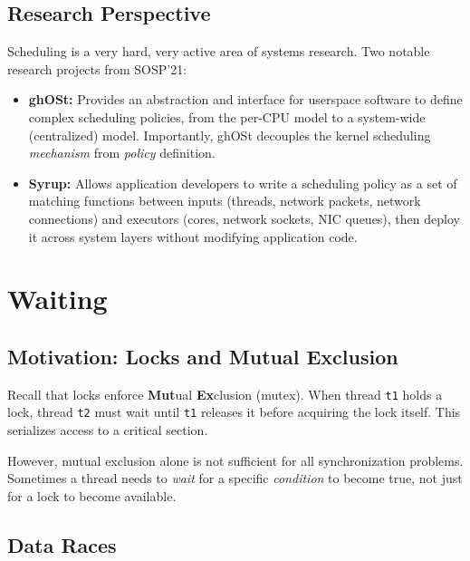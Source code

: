 \documentclass[11pt]{article}
\begin{document}
\subsection{Research Perspective}

Scheduling is a very hard, very active area of systems research. Two notable research projects from SOSP'21:

\begin{itemize}
    \item \textbf{ghOSt:} Provides an abstraction and interface for userspace software to define complex scheduling policies, from the per-CPU model to a system-wide (centralized) model. Importantly, ghOSt decouples the kernel scheduling \emph{mechanism} from \emph{policy} definition.

    \item \textbf{Syrup:} Allows application developers to write a scheduling policy as a set of matching functions between inputs (threads, network packets, network connections) and executors (cores, network sockets, NIC queues), then deploy it across system layers without modifying application code.
\end{itemize}

\section{Waiting}

\subsection{Motivation: Locks and Mutual Exclusion}

Recall that locks enforce \textbf{Mut}ual \textbf{Ex}clusion (mutex). When thread \texttt{t1} holds a lock, thread \texttt{t2} must wait until \texttt{t1} releases it before acquiring the lock itself. This serializes access to a critical section.

However, mutual exclusion alone is not sufficient for all synchronization problems. Sometimes a thread needs to \emph{wait} for a specific \emph{condition} to become true, not just for a lock to become available.

\subsection{Data Races}
\end{document}
